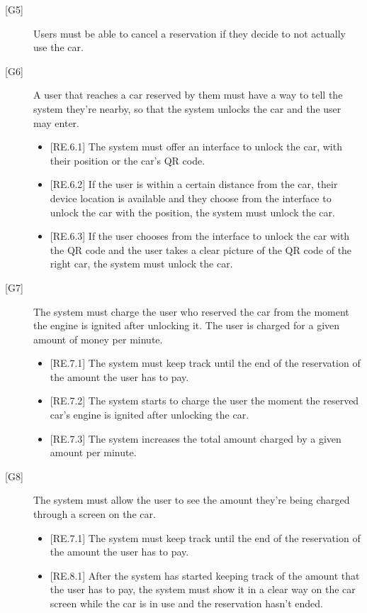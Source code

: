 \documentclass[english]{article}
\begin{document}
\begin{description}
\item[{[G5]}]{Users must be able to cancel a reservation if they decide to not actually use the car.}

\item[{[G6]}]{A user that reaches a car reserved by them must have a way to tell the system they’re nearby, so that the system unlocks the car and the user may enter.
\begin{itemize}
	\item{[RE.6.1] The system must offer an interface to unlock the car, with their position or the car's QR code.}
	\item{[RE.6.2] If the user is within a certain distance from the car, their device location is available and they choose from the interface to unlock the car with the position, the system must unlock the car.}
	\item{[RE.6.3] If the user chooses from the interface to unlock the car with the QR code and the user takes a clear picture of the QR code of the right car, the system must unlock the car.}
\end{itemize}
}

\item[{[G7]}]{The system must charge the user who reserved the car from the moment the engine is ignited after unlocking it. The user is charged for a given	amount of money per minute.
\begin{itemize}
	\item{[RE.7.1] The system must keep track until the end of the reservation of the amount the user has to pay.}
	\item{[RE.7.2] The system starts to charge the user the moment the reserved car’s engine is ignited after unlocking the car.}
	\item{[RE.7.3] The system increases the total amount charged by a given amount per minute.}
\end{itemize}
}

\item[{[G8]}]{The system must allow the user to see the amount they’re being charged through a screen on the car.
\begin{itemize}
	\item{[RE.7.1] The system must keep track until the end of the reservation of the amount the user has to pay.}
	\item{[RE.8.1] After the system has started keeping track of the amount that the user has to pay, the system must show it in a clear way on the car screen while the car is in use and the reservation hasn’t ended.}
\end{itemize}
}


\end{description}
\end{document}
